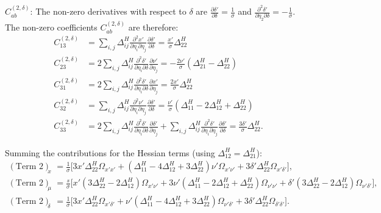 \documentclass{article}
\begin{document}
$C^{(2,\delta)}_{ab}$:
The non-zero derivatives with respect to $\delta$ are $\frac{\partial \delta'}{\partial \delta} = \frac{1}{\sigma}$ and $\frac{\partial^2 \delta'}{\partial \eta_2 \partial \delta} = -\frac{1}{\sigma}$.
The non-zero coefficients $C^{(2,\delta)}_{ab}$ are therefore:
%
\begin{align}
  C^{(2,\delta)}_{13} & = \sum_{i,j} \Delta^H_{ij} \frac{\partial^2 x'}{\partial\eta_i\partial\eta_j}\frac{\partial \delta'}{\partial \delta} = \frac{x'}{\sigma}\Delta^H_{22}                                                                                                                                          \\
  C^{(2,\delta)}_{23} & = 2 \sum_{i,j} \Delta^H_{ij} \frac{\partial^2 \delta'}{\partial\eta_i\partial \delta}\frac{\partial \nu'}{\partial\eta_j} = -\frac{2\nu'}{\sigma}(\Delta^H_{21}-\Delta^H_{22})                                                                                                                  \\
  C^{(2,\delta)}_{31} & = 2 \sum_{i,j} \Delta^H_{ij} \frac{\partial^2 \delta'}{\partial\eta_i\partial \delta}\frac{\partial x'}{\partial\eta_j} = \frac{2x'}{\sigma}\Delta^H_{22}                                                                                                                                       \\
  C^{(2,\delta)}_{32} & = \sum_{i,j} \Delta^H_{ij} \frac{\partial^2 \nu'}{\partial\eta_i\partial\eta_j}\frac{\partial \delta'}{\partial \delta} = \frac{\nu'}{\sigma}(\Delta^H_{11} - 2\Delta^H_{12} + \Delta^H_{22})                                                                                                   \\
  C^{(2,\delta)}_{33} & = 2 \sum_{i,j} \Delta^H_{ij} \frac{\partial^2 \delta'}{\partial\eta_i\partial \delta}\frac{\partial \delta'}{\partial\eta_j} + \sum_{i,j} \Delta^H_{ij} \frac{\partial^2 \delta'}{\partial\eta_i\partial\eta_j}\frac{\partial \delta'}{\partial \delta} = \frac{3\delta'}{\sigma}\Delta^H_{22}.
\end{align}

Summing the contributions for the Hessian terms (using $\Delta^H_{12}=\Delta^H_{21}$):
%
\begin{align}
  (\text{Term 2})_x      & = \frac{1}{\sigma} \Big[ 3 x' \Delta^H_{22} \Omega_{x'x'} + (\Delta^H_{11} - 4\Delta^H_{12} + 3\Delta^H_{22}) \nu' \Omega_{x'\nu'} + 3 \delta' \Delta^H_{22} \Omega_{x'\delta'} \Big],                                     \\
  (\text{Term 2})_\mu    & = \frac{s}{\sigma} \Big[ x'(3\Delta^H_{22} - 2\Delta^H_{12})\Omega_{x'\nu'} + 3\nu'(\Delta^H_{11} - 2\Delta^H_{12} + \Delta^H_{22})\Omega_{\nu'\nu'} + \delta'(3\Delta^H_{22} - 2\Delta^H_{12})\Omega_{\nu'\delta'} \Big], \\
  (\text{Term 2})_\delta & = \frac{1}{\sigma} \Big[ 3 x' \Delta^H_{22} \Omega_{x'\delta'} + \nu'(\Delta^H_{11} - 4\Delta^H_{12} + 3\Delta^H_{22}) \Omega_{\nu'\delta'} + 3\delta'\Delta^H_{22}\Omega_{\delta'\delta'} \Big].
\end{align}
\end{document}
